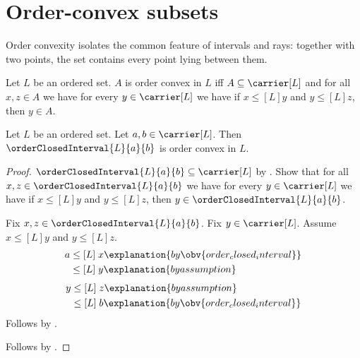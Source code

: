 \section{Order-convex subsets}



Order convexity isolates the common feature of intervals and rays: together
with two points, the set contains every point lying between them.

\begin{definition}\label{order_convex}
    Let $L$ be an ordered set.
    $A$ is order convex in $L$ iff
        $A\subseteq\carrier[L]$ and for all $x,z\in A$ we have
        for every $y\in\carrier[L]$ we have if
            $x\mathrel{\leq[L]}y$ and $y\mathrel{\leq[L]}z$, then
            $y\in A$.
\end{definition}

\begin{proposition}\label{order_closed_interval_is_order_convex}
    Let $L$ be an ordered set.
    Let $a,b\in\carrier[L]$.
    Then $\orderClosedInterval{L}{a}{b}$ is order convex in $L$.
\end{proposition}
\begin{proof}
    $\orderClosedInterval{L}{a}{b}\subseteq\carrier[L]$ by
        .
    Show that for all $x,z\in\orderClosedInterval{L}{a}{b}$ we have
        for every $y\in\carrier[L]$ we have if
            $x\mathrel{\leq[L]}y$ and $y\mathrel{\leq[L]}z$, then
            $y\in\orderClosedInterval{L}{a}{b}$.
    \begin{subproof}
        Fix $x,z\in\orderClosedInterval{L}{a}{b}$.
        Fix $y\in\carrier[L]$.
        Assume $x\mathrel{\leq[L]}y$ and $y\mathrel{\leq[L]}z$.
        \begin{align*}
            a
                &\mathrel{\leq[L]} x
                    \explanation{by \obv{order_closed_interval}}
                    \\
                &\mathrel{\leq[L]} y
                    \explanation{by assumption}
        \end{align*}
        \begin{align*}
            y
                &\mathrel{\leq[L]} z
                    \explanation{by assumption}
                    \\
                &\mathrel{\leq[L]} b
                    \explanation{by \obv{order_closed_interval}}
        \end{align*}
        Follows by .
    \end{subproof}
    Follows by .
\end{proof}

